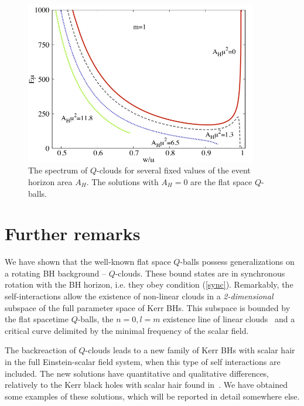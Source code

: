  \begin{figure}[h!]
\centering
\includegraphics[height=2.8in]{papers/QClouds/Ew-fixed-AH.jpeg}
%
\caption{The spectrum of $Q$-clouds for several
fixed values of the event horizon area $A_H$.
The solutions with $A_H=0$
are the flat space $Q$-balls.} 
\label{spectrum}
\end{figure}
   
 
 
\section{Further remarks} 

We have shown that
the well-known flat space $Q$-balls 
possess generalizations on a rotating BH background -- $Q$-clouds. These bound states are 
in synchronous rotation with the BH horizon, i.e. they obey condition (\ref{sync}).
Remarkably,
the self-interactions allow the existence of non-linear clouds 
in a \textit{2-dimensional} subspace of the full parameter space of Kerr BHs.
%
This subspace is bounded by the flat spacetime $Q$-balls,
the  $n=0,l=m$ existence line of linear clouds~\cite{Benone:2014ssa}
and a critical curve delimited by the minimal frequency of the scalar field.
 
The backreaction of $Q$-clouds leads to a new family of Kerr BHs with scalar hair in the full Einstein-scalar field system, when this type of self interactions are included. The new solutions have quantitative and qualitative differences, relatively to the Kerr black holes with scalar hair found in~\cite{Herdeiro:2014goa}. We have obtained some examples of these solutions, which will be reported in detail somewhere else.

